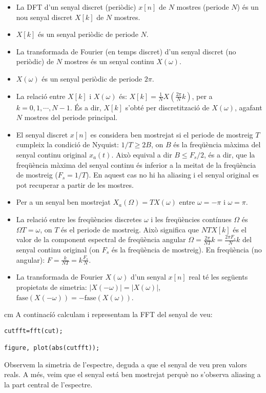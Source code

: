 \documentclass{article}
\begin{document}
\begin{itemize}
\item La DFT d'un senyal discret (periòdic) $x[n]$ de $N$ mostres (periode $N$) és un nou senyal discret $X[k]$ de $N$ mostres.
\item $X[k]$ és un senyal periòdic de periode $N$.
\item La transformada de Fourier (en temps discret) d'un senyal discret (no periòdic) de $N$ mostres és un senyal continu
$X(\omega)$.
\item $X(\omega)$ és un senyal periòdic de periode $2\pi$.
\item La relació entre $X[k]$ i $X(\omega)$ és: $\displaystyle X[k]=\frac{1}{N} X(\frac{2\pi}{N}k)$, 
per a $k=0, 1, \cdots, N-1$.
És a dir, $X[k]$ s'obté per discretització de $X(\omega)$, agafant $N$ mostres del periode principal.
\item El senyal discret $x[n]$ es considera ben mostrejat si el periode de mostreig $T$ cumpleix la condició de Nyquist: 
$1/T \geq 2B$,
on $B$ és la freqüència màxima del senyal continu original $x_a(t)$. 
Això equival a dir $B \leq F_s/2$, és a dir, que la freqüència màxima del senyal continu és inferior a la meitat de
la freqüència de mostreig ($F_s=1/T$).
En aquest cas no hi ha aliasing i el senyal
original es pot recuperar a partir de les mostres.
\item Per a un senyal ben mostrejat $X_a(\Omega)=T X(\omega)$ entre $\omega=-\pi$ i $\omega=\pi$.
\item La relació entre les freqüències discretes $\omega$ i les freqüències contínues $\Omega$ és $\Omega T=\omega$,
on $T$ és el periode de mostreig.
Això significa que $NT X[k]$ és el valor de la component espectral de freqüència angular $\Omega=\frac{2\pi}{NT}k=\frac{2\pi F_s}{N}k$
 del senyal continu original (on $F_s$ és la freqüència de mostreig). En freqüència (no angular): 
 $F=\frac{k}{NT}=k \frac{F_s}{N}$.
\item La transformada de Fourier $X(\omega)$ d'un senyal $x[n]$ real té les següents propietats de simetria:
$|X(-\omega)|=|X(\omega)|$, $\mathrm{fase}(X(-\omega))=-\mathrm{fase}(X(\omega))$.
\end{itemize}

 cm
A continacíó calculam i representam la FFT del senyal de veu:

\begin{verbatim}
cutfft=fft(cut);

figure, plot(abs(cutfft));
\end{verbatim}
Observem la simetria de l'espectre, deguda a que el senyal de veu pren valors reals.
A més, veim que el senyal está ben mostrejat perquè no s'observa aliasing a la part
central de l'espectre.
\end{document}
